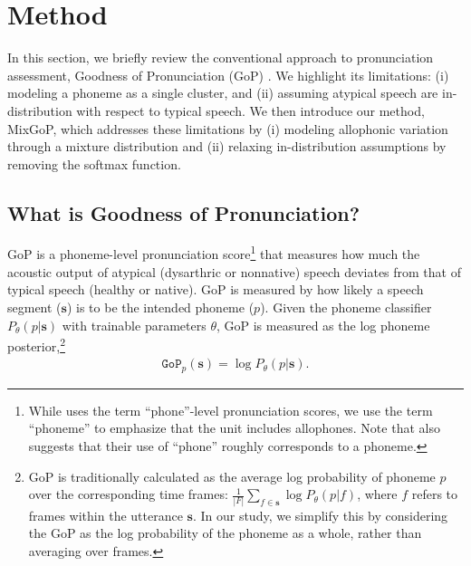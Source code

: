 \section{Method}\label{sec:method}
In this section, we briefly review the conventional approach to pronunciation assessment, Goodness of Pronunciation (GoP) \citep{Witt2000PhonelevelPS}.
We highlight its limitations: (i) modeling a phoneme as a single cluster, and (ii) assuming atypical speech are in-distribution with respect to typical speech. 
We then introduce our method, MixGoP, which addresses these limitations by (i) modeling allophonic variation through a mixture distribution and (ii) relaxing in-distribution assumptions by removing the softmax function.

\subsection{What is Goodness of Pronunciation?}\label{sssec:gop}
GoP is a phoneme-level pronunciation score\footnote{While \citet{Witt2000PhonelevelPS} uses the term ``phone''-level pronunciation scores, we use the term ``phoneme'' to emphasize that the unit includes allophones.
Note that \citet{Witt2000PhonelevelPS} also suggests that their use of ``phone'' roughly corresponds to a phoneme.} that measures how much the acoustic output of atypical (dysarthric or nonnative) speech deviates from that of typical speech (healthy or native).
GoP is measured by how likely a speech segment ($\mathbf{s}$) is to be the intended phoneme ($p$).
Given the phoneme classifier $P_\theta(p | \mathbf{s})$ with trainable parameters $\theta$, GoP is measured as the log phoneme posterior,\footnote{GoP is traditionally calculated as the average log probability of phoneme $p$ over the corresponding time frames: $\frac{1}{|F|} \sum_{f \in \mathbf{s}} \log P_\theta (p | f)$, where $f$ refers to frames within the utterance $\mathbf{s}$. In our study, we simplify this by considering the GoP as the log probability of the phoneme as a whole, rather than averaging over frames.}
\begin{align}
    \texttt{GoP}_p(\mathbf{s}) = \log P_\theta(p | \mathbf{s}).
    \label{eq:gop}
\end{align}


